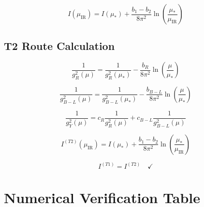 \documentclass[11pt,a4paper]{article}
\theoremstyle{definition}
\begin{document}
\begin{equation}
\label{eq:t1_4}
I(\mu_{\text{IR}}) = I(\mu_*) + \frac{b_1 - b_2}{8\pi^2}\ln\left(\frac{\mu_*}{\mu_{\text{IR}}}\right)
\end{equation}

\subsection{T2 Route Calculation}
\label{subsec:t2_calc}

\begin{equation}
\label{eq:t2_1}
\frac{1}{g_R^2(\mu)} = \frac{1}{g_R^2(\mu_*)} - \frac{b_R}{8\pi^2}\ln\left(\frac{\mu}{\mu_*}\right)
\end{equation}

\begin{equation}
\label{eq:t2_2}
\frac{1}{g_{B-L}^2(\mu)} = \frac{1}{g_{B-L}^2(\mu_*)} - \frac{b_{B-L}}{8\pi^2}\ln\left(\frac{\mu}{\mu_*}\right)
\end{equation}

\begin{equation}
\label{eq:t2_3}
\frac{1}{g_Y^2(\mu)} = c_R\frac{1}{g_R^2(\mu)} + c_{B-L}\frac{1}{g_{B-L}^2(\mu)}
\end{equation}

\begin{equation}
\label{eq:t2_4}
I^{(T2)}(\mu_{\text{IR}}) = I(\mu_*) + \frac{b_1 - b_2}{8\pi^2}\ln\left(\frac{\mu_*}{\mu_{\text{IR}}}\right)
\end{equation}

\begin{equation}
\label{eq:t2_5}
I^{(T1)} = I^{(T2)} \quad \checkmark
\end{equation}

\section{Numerical Verification Table}
\label{app:numerical}
\end{document}
